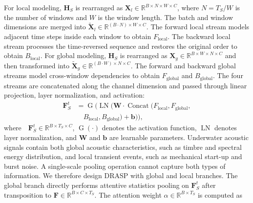 ﻿\documentclass[lettersize,journal]{IEEEtran}
\begin{document}
For local modeling, $\mathbf{H}_S$ is rearranged as $\mathbf{X}_l \in \mathbb{R}^{B \times N \times W \times C}$, where $N=T_S/W$ is the number of windows and $W$ is the window length. The batch and window dimensions are merged into $\tilde{\mathbf{X}}_l \in \mathbb{R}^{(B \cdot N) \times W \times C}$. The forward local stream models adjacent time steps inside each window to obtain $F_{\mathrm{local}}$. The backward local stream processes the time-reversed sequence and restores the original order to obtain $B_{\mathrm{local}}$. For global modeling, $\mathbf{H}_S$ is rearranged as $\mathbf{X}_g \in \mathbb{R}^{B \times W \times N \times C}$ and then transformed into $\tilde{\mathbf{X}}_g \in \mathbb{R}^{(B \cdot W) \times N \times C}$. The forward and backward global streams model cross-window dependencies to obtain $F_{\mathrm{global}}$ and $B_{\mathrm{global}}$. The four streams are concatenated along the channel dimension and passed through linear projection, layer normalization, and activation:
\begin{equation}
\begin{split}
    \mathbf{F}_S^t &= \operatorname{G} \Big( \operatorname{LN} \big( \mathbf{W}\cdot \operatorname{Concat} (F_{\mathrm{local}}, F_{\mathrm{global}}, \\
    &\quad B_{\mathrm{local}}, B_{\mathrm{global}}) + \mathbf{b} \big) \Big), 
\end{split}
\end{equation}
where$\quad \mathbf{F}_S^t \in \mathbb{R}^{B \times T_S \times C}$, $\operatorname{G}(\cdot)$ denotes the activation function, $\operatorname{LN}$ denotes layer normalization, and $\mathbf{W}$ and $\mathbf{b}$ are learnable parameters.
% 
Underwater acoustic signals contain both global acoustic characteristics, such as timbre and spectral energy distribution, and local transient events, such as mechanical start-up and burst noise. A single-scale pooling operation cannot capture both types of information. We therefore design DRASP with global and local branches. The global branch directly performs attentive statistics pooling on $\mathbf{F}_S^t$ after transposition to $\mathbf{F}\in \mathbb{R}^{B \times C \times T_S}$. The attention weight $\alpha \in \mathbb{R}^{B \times T_S}$ is computed as
\end{document}
